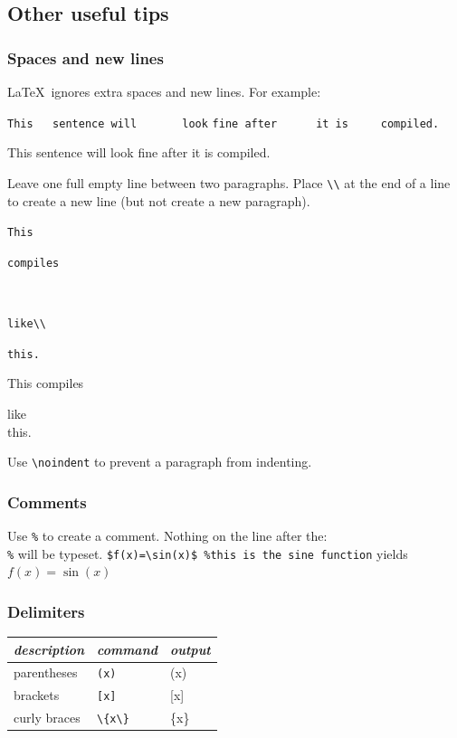 \documentclass{article} %
\begin{document}
    \subsection{Other useful tips}
    \subsubsection{Spaces and new lines}

        \quad \LaTeX\ ignores extra spaces and new lines. For example:
        
        \verb!This   sentence will       look!
        \verb!fine after      it is     compiled.!

        \quad This   sentence will       look fine after      it is     compiled.


        \quad Leave one full empty line between two paragraphs. Place \verb!\\! at the end of a line to create a new line (but not create a new paragraph).

        \verb!This!
        
        \verb!compiles!
        
        ~
        
        \verb!like\\!
        
        \verb!this.!
        
        This
        compiles 
        
        like\\
        this.
        
        Use  \verb!\noindent! to prevent a paragraph from indenting.
        
    \subsubsection{Comments}
        
        \quad Use \verb!%! to create a comment. Nothing on the line after the: \\ \verb!%! will be typeset. \verb!$f(x)=\sin(x)$ %this is the sine function! yields $f(x)=\sin(x)$ %

    \subsubsection{Delimiters}

        \begin{center}
        \begin{tabular}{l|l|l}
        \emph{description} & \emph{command} & \emph{output}\\ \hline
        parentheses &\verb!(x)! & (x)\\
        brackets &\verb![x]! & [x]\\
        curly braces& \verb!\{x\}! & \{x\}\\
        \end{tabular}
        \end{center}
        
\end{document}
